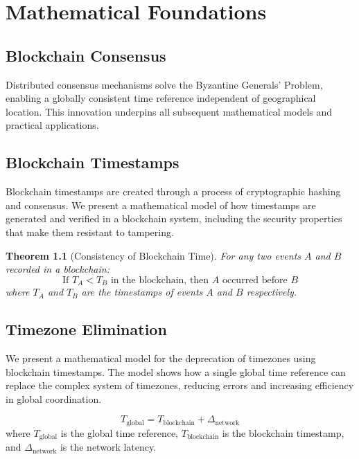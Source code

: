 \documentclass[12pt]{report}
\newtheorem{theorem}{Theorem}
\begin{document}
\chapter{Mathematical Foundations}

\section{Blockchain Consensus}
Distributed consensus mechanisms solve the Byzantine Generals' Problem, enabling a globally consistent time reference independent of geographical location. This innovation underpins all subsequent mathematical models and practical applications.

\section{Blockchain Timestamps}
Blockchain timestamps are created through a process of cryptographic hashing and consensus. We present a mathematical model of how timestamps are generated and verified in a blockchain system, including the security properties that make them resistant to tampering.

\begin{theorem}[Consistency of Blockchain Time]
For any two events \( A \) and \( B \) recorded in a blockchain:
\begin{equation}
\text{If } T_A < T_B \text{ in the blockchain, then } A \text{ occurred before } B
\end{equation}
where \( T_A \) and \( T_B \) are the timestamps of events \( A \) and \( B \) respectively.
\end{theorem}

\section{Timezone Elimination}
We present a mathematical model for the deprecation of timezones using blockchain timestamps. The model shows how a single global time reference can replace the complex system of timezones, reducing errors and increasing efficiency in global coordination.

\begin{equation}
T_{\text{global}} = T_{\text{blockchain}} + \Delta_{\text{network}}
\end{equation}
where \( T_{\text{global}} \) is the global time reference, \( T_{\text{blockchain}} \) is the blockchain timestamp, and \( \Delta_{\text{network}} \) is the network latency.
\end{document}
